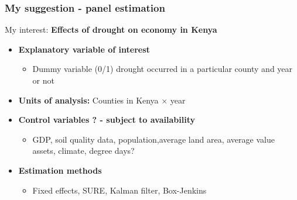\documentclass{beamer}              %
\begin{document}
\begin{frame}

\frametitle{My suggestion - panel estimation}\label{MySuggestion3} 

My interest: \textbf{Effects of drought on economy in Kenya}
\begin{itemize}


\item \textbf{Explanatory variable of interest}

\begin{itemize}
\item Dummy variable (0/1) drought occurred in a particular county and year or not

\end{itemize}


\item \textbf{Units of analysis:} Counties in Kenya $\times$ year

\item \textbf{Control variables ? - subject to availability}

\begin{itemize}
\item GDP, soil quality data, population,average land area, average value assets,  climate, degree days?
\end{itemize}

\item \textbf{Estimation methods}

\begin{itemize}
\item Fixed effects, SURE, Kalman filter, Box-Jenkins
\end{itemize}



\end{itemize}

\end{frame}
















\end{document}
